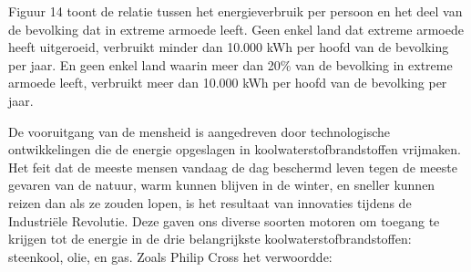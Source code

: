 Figuur 14 toont de relatie tussen het energieverbruik per persoon en het deel van de bevolking dat in extreme armoede leeft. Geen enkel land dat extreme armoede heeft uitgeroeid, verbruikt minder dan 10.000 kWh per hoofd van de bevolking per jaar. En geen enkel land waarin meer dan 20\% van de bevolking in extreme armoede leeft, verbruikt meer dan 10.000 kWh per hoofd van de bevolking per jaar.

De vooruitgang van de mensheid is aangedreven door technologische ontwikkelingen die de energie opgeslagen in koolwaterstofbrandstoffen vrijmaken. Het feit dat de meeste mensen vandaag de dag beschermd leven tegen de meeste gevaren van de natuur, warm kunnen blijven in de winter, en sneller kunnen reizen dan als ze zouden lopen, is het resultaat van innovaties tijdens de Industriële Revolutie. Deze gaven ons diverse soorten motoren om toegang te krijgen tot de energie in de drie belangrijkste koolwaterstofbrandstoffen: steenkool, olie, en gas. Zoals Philip Cross het verwoordde:

